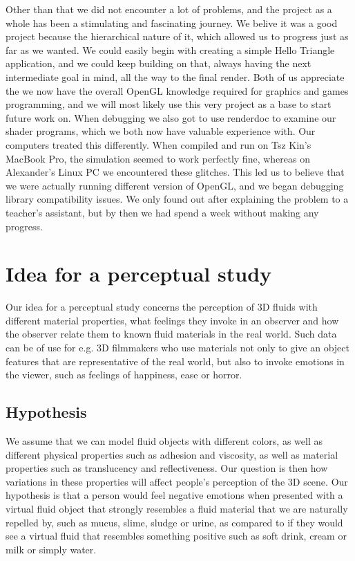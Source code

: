 \documentclass{article}
\begin{document}
\begin{multicols}{2}
    Other than that we did not encounter a lot of problems, and the project as a whole has been a stimulating and fascinating journey.
    We belive it was a good project because the hierarchical nature of it, which allowed us to progress just as far as we wanted.
    We could easily begin with creating a simple Hello Triangle application, and we could keep building on that, always having the next intermediate goal in mind, all the way to the final render.
    Both of us appreciate the we now have the overall OpenGL knowledge required for graphics and games programming, and we will most likely use this very project as a base to start future work on.
    When debugging we also got to use renderdoc to examine our shader programs, which we both now have valuable experience with.
    Our computers treated this differently. When compiled and run on Tsz Kin's MacBook Pro, the simulation seemed to work perfectly fine, whereas on Alexander's Linux PC we encountered these glitches. This led us to believe that we were actually running different version of OpenGL, and we began debugging library compatibility issues. We only found out after explaining the problem to a teacher's assistant, but by then we had spend a week without making any progress.

    \section{Idea for a perceptual study}

        Our idea for a perceptual study concerns the perception of 3D fluids with different material properties, what feelings they invoke in an observer and how the observer relate them to known fluid materials in the real world. Such data can be of use for e.g. 3D filmmakers who use materials not only to give an object features that are representative of the real world, but also to invoke emotions in the viewer, such as feelings of happiness, ease or horror.

        \subsection{Hypothesis}

            We assume that we can model fluid objects with different colors, as well as different physical properties such as adhesion and viscosity, as well as material properties such as translucency and reflectiveness.
            Our question is then how variations in these properties will affect people's perception of the 3D scene.
            Our hypothesis is that a person would feel negative emotions when presented with a virtual fluid object that strongly resembles a fluid material that we are naturally repelled by, such as mucus, slime, sludge or urine, as compared to if they would see a virtual fluid that resembles something positive such as soft drink, cream or milk or simply water.


\end{multicols}
\end{document}
